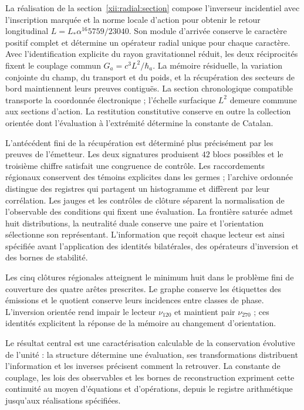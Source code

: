 La réalisation de la section~\ref{xii:radial:section} compose l’inverseur
incidentiel avec l’inscription marquée et la norme locale d’action pour
obtenir le retour longitudinal \(L=L_*\alpha^{16}5759/23040\).
Son module d’arrivée conserve le caractère positif complet et détermine
un opérateur radial unique pour chaque caractère. Avec l’identification explicite
du rayon gravitationnel réduit, les deux réciprocités fixent le couplage
commun \(G_a=c^3L^2/\hbar_a\). La mémoire résiduelle, la variation conjointe
du champ, du transport et du poids, et la récupération des secteurs de bord
maintiennent leurs preuves contiguës. La section chronologique compatible transporte
la coordonnée électronique ; l’échelle surfacique \(L^2\) demeure commune aux
sections d’action. La restitution constitutive conserve en outre la collection
orientée dont l’évaluation à l’extrémité détermine la constante de Catalan.

L'antécédent fini de la récupération est déterminé plus précisément par les preuves de l'émetteur. Les deux signatures produisent \(42\) blocs possibles et le troisième chiffre satisfait une congruence de contrôle. Les raccordements régionaux conservent des témoins explicites dans les germes ; l'archive ordonnée distingue des registres qui partagent un histogramme et diffèrent par leur corrélation. Les jauges et les contrôles de clôture séparent la normalisation de l'observable des conditions qui fixent une évaluation. La frontière saturée admet huit distributions, la neutralité duale conserve une paire et l'orientation sélectionne son représentant. L'information que reçoit chaque lecteur est ainsi spécifiée avant l'application des identités bilatérales, des opérateurs d'inversion et des bornes de stabilité.

Les cinq clôtures régionales atteignent le minimum huit dans le problème fini de couverture des quatre arêtes prescrites. Le graphe conserve les étiquettes des émissions et le quotient conserve leurs incidences entre classes de phase. L'inversion orientée rend impair le lecteur \(\nu_{120}\) et maintient pair \(\nu_{270}\) ; ces identités explicitent la réponse de la mémoire au changement d'orientation.



Le résultat central est une caractérisation calculable de la conservation évolutive de l’unité : la structure détermine une évaluation, ses transformations distribuent l’information et les inverses précisent comment la retrouver. La constante de couplage, les lois des observables et les bornes de reconstruction expriment cette continuité au moyen d’équations et d’opérations, depuis le registre arithmétique jusqu’aux réalisations spécifiées.

